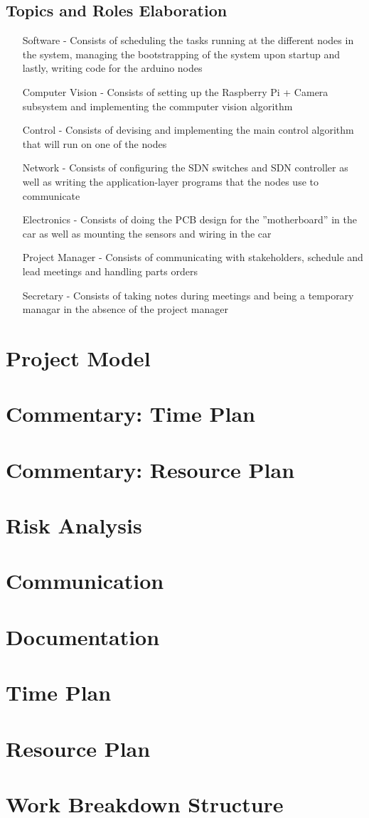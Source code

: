 \documentclass[11pt, titlepage]{article} %
\begin{document}
\subsection{Topics and Roles Elaboration}
\begin{itemize}
\item[Software] - Consists of scheduling the tasks running at the different
    nodes in the system, managing the bootstrapping of the system upon
    startup and lastly, writing code for the arduino nodes
\item[Computer Vision] - Consists of setting up the Raspberry Pi + Camera
    subsystem and implementing the commputer vision algorithm
\item[Control] - Consists of devising and implementing the main
    control algorithm that will run on one of the nodes
\item[Network] - Consists of configuring the SDN switches and SDN controller
    as well as writing the application-layer programs that the nodes
    use to communicate
\item[Electronics] - Consists of doing the PCB design for the
    ''motherboard'' in the car as well as mounting the sensors and 
    wiring in the car
\item[Project Manager] - Consists of communicating with stakeholders, 
    schedule and lead meetings and handling parts orders
\item[Secretary] - Consists of taking notes during meetings and
    being a temporary managar in the absence of the project manager
\end{itemize}

\section{Project Model}
\section{Commentary: Time Plan}
\section{Commentary: Resource Plan}
\section{Risk Analysis}
\section{Communication}
\section{Documentation}

\clearpage



\clearpage
\appendix
\section{Time Plan}
\section{Resource Plan}
\section{Work Breakdown Structure}
\end{document}
